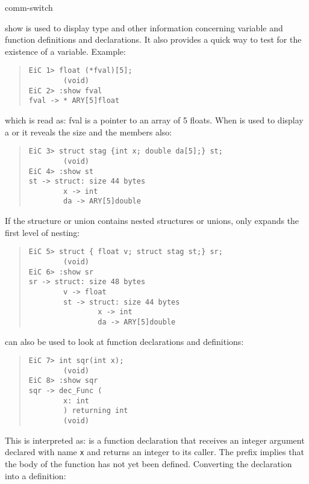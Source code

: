 \small
\begin{Ventry}{comm-switch }

\item[show] 
\label{item:show}
is used to display type and other information concerning
variable and function definitions and declarations. It also
provides a quick way to test for the existence of a
variable. Example: 

\begin{quote}
\begin{verbatim}
EiC 1> float (*fval)[5];
        (void)
EiC 2> :show fval
fval -> * ARY[5]float 
\end{verbatim}
\end{quote}


which is read as: fval is a pointer to an array of 5 floats. When 
is used to display a  or  it reveals the size
and the members also:

\begin{quote}
\begin{verbatim}
EiC 3> struct stag {int x; double da[5];} st;
        (void)
EiC 4> :show st
st -> struct: size 44 bytes
        x -> int 
        da -> ARY[5]double 
\end{verbatim}
\end{quote}

If the structure or union contains nested structures or unions,
 only expands the first level of nesting:

\begin{quote}
\begin{verbatim}
EiC 5> struct { float v; struct stag st;} sr;
        (void)
EiC 6> :show sr
sr -> struct: size 48 bytes
        v -> float 
        st -> struct: size 44 bytes
                x -> int 
                da -> ARY[5]double 
\end{verbatim}
\end{quote}
 

 can also be used to look at function declarations
and definitions:

\begin{quote}
\begin{verbatim}
EiC 7> int sqr(int x);
        (void)
EiC 8> :show sqr
sqr -> dec_Func (
        x: int 
        ) returning int 
        (void)
\end{verbatim}
\end{quote}

This is interpreted as:  is a function declaration  that
receives an integer argument declared with name {\tt x} and returns
an integer to its caller. The prefix  implies that the body
of the function has not yet been defined. Converting the declaration
into a definition:


\end{Ventry}
